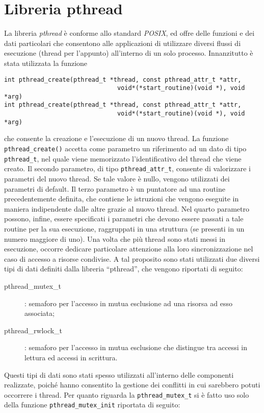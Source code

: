 \section{Libreria pthread}
La libreria \textit{pthread} è conforme allo standard \textit{POSIX}, ed offre delle funzioni e dei dati particolari che consentono alle applicazioni di utilizzare diversi flussi di esecuzione (thread per l’appunto) all’interno di un solo processo. 
Innanzitutto è stata utilizzata la funzione
\begin{lstlisting}
int pthread_create(pthread_t *thread, const pthread_attr_t *attr,
                               void*(*start_routine)(void *), void *arg)
int pthread_create(pthread_t *thread, const pthread_attr_t *attr,
                               void*(*start_routine)(void *), void *arg)
\end{lstlisting}
che consente la creazione e l’esecuzione di un nuovo thread. La funzione \texttt{pthread\_create()} accetta come parametro un riferimento ad un dato di tipo \texttt{pthread\_t}, nel quale viene memorizzato l’identificativo del thread che viene creato. Il secondo parametro, di tipo \texttt{pthread\_attr\_t}, consente di valorizzare i parametri del nuovo thread. Se tale valore è nullo, vengono utilizzati dei parametri di default. Il terzo parametro è un puntatore ad una routine precedentemente definita, che contiene le istruzioni che vengono eseguite in maniera indipendente dalle altre grazie al nuovo thread. Nel quarto parametro possono, infine, essere specificati i parametri che devono essere passati a tale routine per la sua esecuzione, raggruppati in una struttura (se presenti in un numero maggiore di uno). Una volta che più thread sono stati messi in esecuzione, occorre dedicare particolare attenzione alla loro sincronizzazione nel caso di accesso a risorse condivise. A tal proposito sono stati utilizzati due diversi tipi di dati 
definiti dalla libreria “pthread”, che vengono riportati di seguito:
\begin{description}
\item[pthread\_mutex\_t]: semaforo per l’accesso in mutua esclusione ad una risorsa ad esso associata;
\item[pthread\_rwlock\_t]: semaforo per l'accesso in mutua esclusione che distingue tra accessi in lettura ed accessi in scrittura.
\end{description}
Questi tipi di dati sono stati spesso utilizzati all’interno delle componenti realizzate, poiché hanno consentito la gestione dei conflitti in cui sarebbero potuti occorrere i thread. Per quanto riguarda la \texttt{pthread\_mutex\_t} si è fatto uso solo della funzione \texttt{pthread\_mutex\_init} riportata di seguito:
